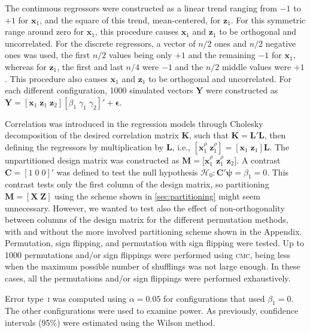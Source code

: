 The continuous regressors were constructed as a linear trend ranging from $-1$ to $+1$ for $\mathbf{x}_1$, and the square of this trend, mean-centered, for $\mathbf{z}_1$. For this symmetric range around zero for $\mathbf{x}_1$, this procedure causes $\mathbf{x}_1$ and $\mathbf{z}_1$ to be orthogonal and uncorrelated. For the discrete regressors, a vector of $n/2$ ones and $n/2$ negative ones was used, the first $n/2$ values being only $+1$ and the remaining $-1$ for $\mathbf{x}_1$, whereas for $\mathbf{z}_1$, the first and last $n/4$ were $-1$ and the $n/2$ middle values were $+1$. This procedure also causes $\mathbf{x}_1$ and $\mathbf{z}_1$ to be orthogonal and uncorrelated. For each different configuration, 1000 simulated vectors $\mathbf{Y}$ were constructed as $\mathbf{Y}=[\mathbf{x}_{1} \; \mathbf{z}_{1} \; \mathbf{z}_{2}][\beta_1 \; \gamma_1 \; \gamma_2]'+\boldsymbol{\epsilon}$.

Correlation was introduced in the regression models through Cholesky decomposition of the desired correlation matrix $\mathbf{K}$, such that $\mathbf{K}=\mathbf{L}'\mathbf{L}$, then defining the regressors by multiplication by $\mathbf{L}$, i.e., $[\mathbf{x}_{1}^{\rho} \; \mathbf{z}_{1}^{\rho}] = [\mathbf{x}_{1} \; \mathbf{z}_{1}]\mathbf{L}$. The unpartitioned design matrix was constructed as $\mathbf{M}=[\mathbf{x}_{1}^{\rho}$  $\mathbf{z}_{1}^{\rho}$ $\mathbf{z}_{2}]$. A contrast $\mathbf{C}=[1 \; 0 \; 0]'$ was defined to test the null hypothesis $\mathcal{H}_{0} : \mathbf{C}'\boldsymbol{\psi} = \beta_{1} = 0$. This contrast tests only the first column of the design matrix, so partitioning $\mathbf{M}=[\mathbf{X} \; \mathbf{Z}]$ using the scheme shown in \ref{sec:partitioning} might seem unnecessary. However, we wanted to test also the effect of non-orthogonality between columns of the design matrix for the different permutation methods, with and without the more involved partitioning scheme shown in the Appendix. Permutation, sign flipping, and permutation with sign flipping were tested. Up to 1000 permutations and/or sign flippings were performed using \textsc{cmc}, being less when the maximum possible number of shufflings was not large enough. In these cases, all the permutations and/or sign flippings were performed exhaustively.

Error type~\textsc{i} was computed using $\alpha=0.05$ for configurations that used $\beta_{1}=0$. The other configurations were used to examine power. As previously, confidence intervals (95\%) were estimated using the Wilson method.

